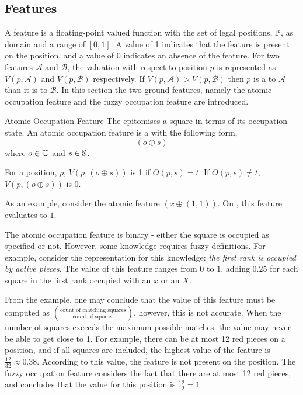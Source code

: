 \subsection{Features}
\label{sec:language-features}
A feature is a floating-point valued function with the set of legal positions, $\mathbb{P}$, as domain and a range of  $[0,1]$.  A value of 1 indicates that the feature is present on the position, and a value of 0 indicates an absence of the feature. For two features $\mathcal{A}$ and $\mathcal{B}$, the valuation with respect to position $p$ is represented as $V(p,\mathcal{A})$ and $V(p,\mathcal{B})$ respectively. If $V(p,\mathcal{A}) > V(p,\mathcal{B})$  then $p$ is a  to $\mathcal{A}$  than it is to $\mathcal{B}$. In this section the two ground features, namely the atomic occupation feature and the fuzzy occupation feature are introduced.

\begin{definition} {Atomic Occupation Feature}
The  epitomises a square in terms of its occupation state.   An atomic occupation feature is a \mywff{}  with the following form, 
\[
( o \oplus s )
\]
where $o \in \mathbb{O}$ and $ s \in \mathbb{S}$.

For a position, $p$, $V(p,( o \oplus s ) )$ is 1 if $O(p,s) = t$.  If $O(p,s) \neq t$,  $V(p,(o \oplus s))$ is 0.
\end{definition}

As an example, consider the atomic feature $( x \oplus (1,1) )$.  On \myrefboard,  this feature evaluates to $1$.

The atomic occupation feature is binary - either the square is occupied as specified or not.  However, some knowledge requires fuzzy definitions.  For example, consider the representation for this knowledge: {\it the first rank is occupied by active pieces}. The value of this feature ranges from $0$ to $1$, adding $0.25$ for each square in the first rank occupied with an $x$ or an $X$.

From the example, one may conclude that the value of this feature must be computed as $\left(\frac {\mbox{count of matching squares}} {\mbox{count of squares}}\right)$, however, this is not accurate.  When the number of squares exceeds the maximum possible matches, the value may never be able to get close to 1.  For example, there can be at most 12 red pieces on a  position, and if all squares are included, the highest value of the feature is $\frac{12}{32} \approx 0.38$.  According to this value, the feature is not present on the position.   The fuzzy occupation feature considers the fact that there are at most 12 red pieces, and concludes that the value for this position is $\frac{12}{12} = 1$.

